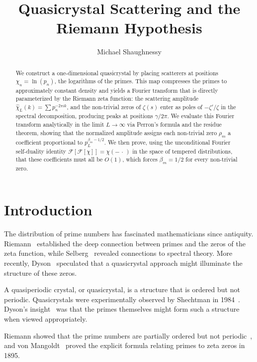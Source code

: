 \documentclass[11pt, oneside]{article}
\title{Quasicrystal Scattering and the Riemann Hypothesis}
\author{Michael Shaughnessy}
\theoremstyle{definition}
\begin{document}
\maketitle

\begin{abstract}
We construct a one-dimensional quasicrystal by placing scatterers at
positions $\chi_n = \ln(p_n)$, the logarithms of the primes.
This map compresses the primes to approximately constant density and
yields a Fourier transform that is directly parameterized by the
Riemann zeta function: the scattering amplitude
$\hat{\chi}_L(k) = \sum p_n^{-2\pi ik}$, and the non-trivial zeros
of $\zeta(s)$ enter as poles of $-\zeta'/\zeta$ in the spectral
decomposition, producing peaks at positions $\gamma/2\pi$.
We evaluate this Fourier transform analytically in the limit
$L\to\infty$ via Perron's formula and the residue theorem, showing
that the normalized amplitude assigns each non-trivial zero $\rho_m$
a coefficient proportional to $p_L^{\beta_m - 1/2}$.
We then prove, using the unconditional Fourier self-duality identity
$\mathcal{F}[\mathcal{F}[\chi]] = \chi(-\,\cdot\,)$ in the space of
tempered distributions, that these coefficients must all be $O(1)$,
which forces $\beta_m = 1/2$ for every non-trivial zero.
\end{abstract}

\section{Introduction}

The distribution of prime numbers has fascinated mathematicians since
antiquity. Riemann~\cite{Riemann1859} established the deep connection
between primes and the zeros of the zeta function, while
Selberg~\cite{Selberg1956} revealed connections to spectral theory.
More recently, Dyson~\cite{Dyson2009} speculated that a quasicrystal
approach might illuminate the structure of these zeros.

A quasiperiodic crystal, or quasicrystal, is a structure that is
ordered but not periodic. Quasicrystals were experimentally observed
by Shechtman in 1984~\cite{Shechtman1984}. Dyson's
insight~\cite{Baez2013} was that the primes themselves might form
such a structure when viewed appropriately.

Riemann showed that the prime numbers are partially ordered but not
periodic~\cite{Riemann1859}, and von Mangoldt~\cite{VonMangoldt1895}
proved the explicit formula relating primes to zeta zeros in 1895.
\end{document}
